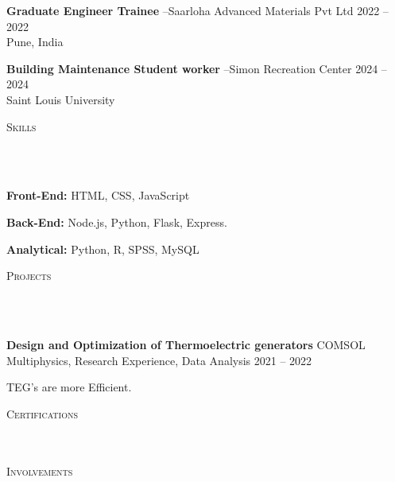 \documentclass{article}
\newcommand{\employer}[4]{{
        \vspace*{2pt}%
        \textbf{#1} #2 \hfill #3\\ #4 \vspace*{2pt}}
        }
\newcommand{\project}[4]{{
          \vspace*{2pt}%
          \textbf{#1} #2 \hfill #3\\ #4 \vspace*{2pt}}
          }
\newcommand{\lineunder}{
        \vspace*{-8pt} \\ \hspace*{-18pt} 
        \hrulefill \\
        }
\newcommand{\header}[1]{{
        \hspace*{-15pt}\vspace*{6pt} \textsc{#1}} \vspace*{-6pt} 
        \lineunder
        }
\renewcommand{\labelitemii}{
        $\vcenter{\hbox{\tiny$\bullet$}}$\hspace*{-3pt}
        }
\newenvironment{bullet-list-major}{
          \begin{list}{\labelitemii}{\setlength\leftmargin{3pt} 
          \topsep 0pt \itemsep -2pt}}{\vspace*{4pt}\end{list}
          }
\newenvironment{bullet-list-minor}{
          \begin{list}{\labelitemii}{\setlength\leftmargin{15pt} 
            \topsep 0pt \itemsep -2pt}}{\vspace*{4pt}\end{list}
            }
\begin{document}
      {
      \employer{Graduate Engineer Trainee}{--Saarloha Advanced Materials Pvt Ltd}{2022 -- 2022}{Pune, India}
      \begin{bullet-list-minor}
          
      \end{bullet-list-minor}
  


      \employer{Building Maintenance Student worker}{--Simon Recreation Center }{2024 -- 2024}{Saint Louis University }
      \begin{bullet-list-minor}
          \item 
      \end{bullet-list-minor}
  }
      \vspace*{4pt}%
      \header{Skills}
      {
        \begin{bullet-list-major}
        \item \textbf{Front-End:} HTML, CSS, JavaScript
        \end{bullet-list-major}
        

        \begin{bullet-list-major}
        \item \textbf{Back-End:} Node.js, Python, Flask, Express.
        \end{bullet-list-major}
        

        \begin{bullet-list-major}
        \item \textbf{Analytical:} Python, R, SPSS, MySQL
        \end{bullet-list-major}
        }
  
      \vspace*{4pt}%
      \header{Projects}
      {
      \project{Design and Optimization of Thermoelectric generators}{COMSOL Multiphysics, Research Experience, Data Analysis}{2021 -- 2022}{
          \begin{bullet-list-minor}
              \item TEG's are more Efficient.
          \end{bullet-list-minor}
      }
  }
  
      \vspace*{4pt}%
      \header{Certifications}
      {}
      \vspace*{4pt}%
      \header{Involvements}
      {}
      
\end{document}
